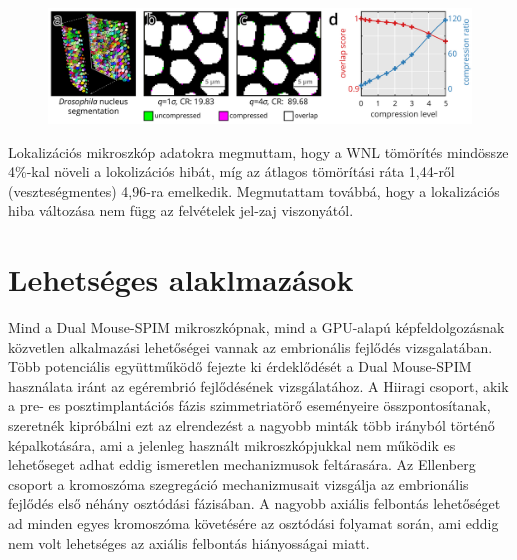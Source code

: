 \documentclass{booklet_style}
\begin{document}
    \begin{figure}
      \centering
      \includegraphics[page=1,width=\textwidth]{4_gpu/LLvsB3D}
      \label{fig:wnlDroso}
    \end{figure}

    Lokalizációs mikroszkóp adatokra megmuttam, hogy a WNL tömörítés mindössze 4\%-kal növeli a lokolizációs hibát, míg az átlagos tömörítási ráta 1,44-ről (veszteségmentes) 4,96-ra emelkedik. Megmutattam továbbá, hogy a lokalizációs hiba változása nem függ az felvételek jel-zaj viszonyától.

    


\section{Lehetséges alaklmazások}
Mind a Dual Mouse-SPIM mikroszkópnak, mind a GPU-alapú képfeldolgozásnak közvetlen alkalmazási lehetőségei vannak az embrionális fejlődés vizsgalatában. Több potenciális együttműködő fejezte ki érdeklődését a Dual Mouse-SPIM használata iránt az egérembrió fejlődésének vizsgálatához. A Hiiragi
csoport, akik a pre- es posztimplantációs fázis szimmetriatörő eseményeire összpontosítanak, szeretnék kipróbálni ezt az elrendezést a nagyobb minták több irányból történő képalkotására, ami a jelenleg használt mikroszkópjukkal nem működik es lehetőseget adhat eddig ismeretlen mechanizmusok feltárasára. Az Ellenberg csoport a kromoszóma szegregáció mechanizmusait vizsgálja az embrionális fejlődés első néhány osztódási fázisában. A nagyobb axiális felbontás lehetőséget ad minden egyes kromoszóma követésére az osztódási folyamat során, ami eddig nem volt lehetséges az axiális felbontás hiányosságai miatt.
\end{document}

